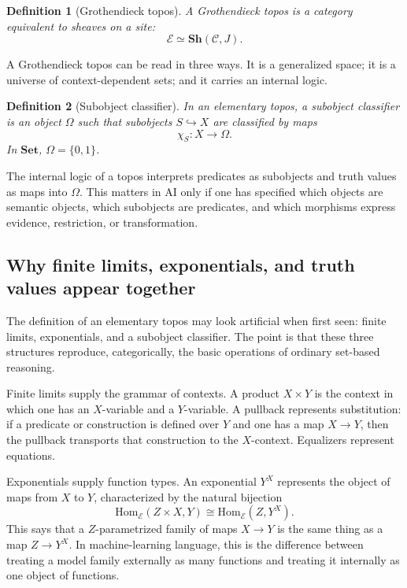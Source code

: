 \documentclass[11pt]{article}
\newtheorem{definition}{Definition}[section]
\newcommand{\Set}{\mathbf{Set}}
\newcommand{\Sh}{\mathbf{Sh}}
\newcommand{\Hom}{\mathrm{Hom}}
\begin{document}
\begin{definition}[Grothendieck topos]
A Grothendieck topos is a category equivalent to sheaves on a site:
\[
\mathcal E\simeq \Sh(\mathcal C,J).
\]
\end{definition}

A Grothendieck topos can be read in three ways. It is a generalized space; it is
a universe of context-dependent sets; and it carries an internal logic.

\begin{definition}[Subobject classifier]
In an elementary topos, a subobject classifier is an object \(\Omega\) such that
subobjects \(S\hookrightarrow X\) are classified by maps
\[
\chi_S:X\to\Omega.
\]
In \(\Set\), \(\Omega=\{0,1\}\).
\end{definition}

The internal logic of a topos interprets predicates as subobjects and truth
values as maps into \(\Omega\). This matters in AI only if one has specified
which objects are semantic objects, which subobjects are predicates, and which
morphisms express evidence, restriction, or transformation.

\subsection{Why finite limits, exponentials, and truth values appear together}

The definition of an elementary topos may look artificial when first seen:
finite limits, exponentials, and a subobject classifier. The point is that
these three structures reproduce, categorically, the basic operations of
ordinary set-based reasoning.

Finite limits supply the grammar of contexts. A product \(X\times Y\) is the
context in which one has an \(X\)-variable and a \(Y\)-variable. A pullback
represents substitution: if a predicate or construction is defined over \(Y\)
and one has a map \(X\to Y\), then the pullback transports that construction to
the \(X\)-context. Equalizers represent equations.

Exponentials supply function types. An exponential \(Y^X\) represents the object
of maps from \(X\) to \(Y\), characterized by the natural bijection
\[
\Hom_{\mathcal E}(Z\times X,Y)\cong \Hom_{\mathcal E}(Z,Y^X).
\]
This says that a \(Z\)-parametrized family of maps \(X\to Y\) is the same thing
as a map \(Z\to Y^X\). In machine-learning language, this is the difference
between treating a model family externally as many functions and treating it
internally as one object of functions.
\end{document}
